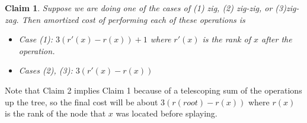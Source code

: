 \documentclass[11pt]{article}
\newtheorem{claim}[theorem]{Claim}
\begin{document}
\begin{claim}
Suppose we are doing one of the cases of (1) zig, (2) zig-zig, or (3)zig-zag. Then amortized cost of performing each of these operations is 
\begin{itemize}
    \item Case (1): $3(r'(x)-r(x))+1$ where $r'(x)$ is the rank of $x$ after the operation.
    \item Cases (2), (3): $3(r'(x) - r(x))$
\end{itemize}
\end{claim}

Note that Claim 2 implies Claim 1 because of a telescoping sum of the operations up the tree, so the final cost will be about $3(r(root)-r(x))$ where $r(x)$ is the rank of the node that $x$ was located before splaying.
\end{document}
